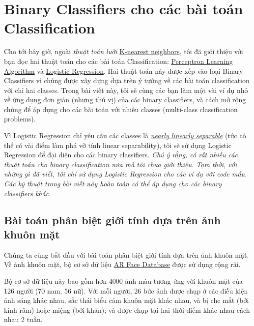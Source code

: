 \chapter{Binary Classifiers cho các bài toán Classification}
 
Cho tới bây giờ, ngoài \textit{thuật toán lười} \href{http://machinelearningcoban.com/2017/01/08/knn/}{K-nearest neighbors}, tôi đã giới thiệu với bạn đọc hai thuật toán cho các bài toán Classification: \href{http://machinelearningcoban.com/2017/01/21/perceptron/}{Perceptron Learning Algorithm} và \href{http://machinelearningcoban.com/2017/01/27/logisticregression/}{Logistic Regression}. Hai thuật toán này được xếp vào loại Binary Classifiers vì chúng được xây dựng dựa trên ý tưởng về các bài toán classification với chỉ hai classes. Trong bài viết này, tôi sẽ cùng các bạn làm một vài ví dụ nhỏ về ứng dụng đơn giản (nhưng thú vị) của các binary classifiers, và cách mở rộng chúng để áp dụng cho các bài toán với nhiều classes (multi-class classification problems).  
 
 
Vì Logistic Regression chỉ yêu cầu các classes là \href{http://machinelearningcoban.com/2017/01/21/perceptron/#bai-toan-perceptron}{\textit{nearly linearly separable}} (tức có thể có vài điểm làm phá vỡ tính linear separability), tôi sẽ sử dụng Logistic Regression để đại diện cho các binary classifiers. \textit{Chú ý rằng, có rất nhiều các thuật toán cho binary classification nữa mà tôi chưa giới thiệu. Tạm thời, với những gì đã viết, tôi chỉ sử dụng Logistic Regression cho các ví dụ với code mẫu. Các kỹ thuật trong bài viết này hoàn toàn có thể áp dụng cho các binary classifiers khác.} 
 
  
 
 
 
\section{Bài toán phân biệt giới tính dựa trên ảnh khuôn mặt }
Chúng ta cùng bắt đầu với bài toán phân biệt giới tính dựa trên ảnh khuôn mặt. Về ảnh khuôn mặt, bộ cơ sở dữ liệu \href{http://www2.ece.ohio-state.edu/~aleix/ARdatabase.html}{AR Face Database} được sử dụng rộng rãi.  
 
Bộ cơ sở dữ liệu này bao gồm hơn 4000 ảnh màu tương ứng với khuôn mặt của 126 người (70 nam, 56 nữ). Với mỗi người, 26 bức ảnh được chụp ở các điều kiện ánh sáng khác nhau, sắc thái biểu cảm khuôn mặt khác nhau, và bị che mắt (bởi kính râm) hoặc miệng (bởi khăn); và được chụp tại hai thời điểm khác nhau cách nhau 2 tuần.  
 
